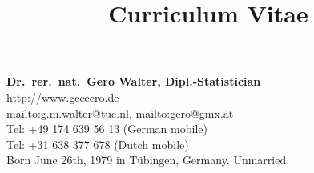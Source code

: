 \documentclass[a4paper]{simplecv}
\begin{document}
\pagestyle{myheadings}




\title{Curriculum Vitae}

\nocite{2016:walter-flapper}
\nocite{2017:walter-aslett-coolen}
\nocite{2016:walter-coolen}
\nocite{ipmu2016}
\nocite{2016:coolenetal}
\nocite{2015:walter-graham-coolen}
\nocite{itip-statinf,Troffaes2014a,diss,Walter2012b,Troffaes2012a,Walter2011a,Walter2010a,%
Walter2009b,Walter2009a,Walter2007c,Walter2007b,Walter2007a,Walter2006a}

\vspace*{-10ex}
\maketitle

\textbf{\large Dr.\ rer.\ nat.\ Gero Walter, Dipl.-Statistician}\\[2ex]
\url{http://www.geeeero.de}\\
\url{mailto:g.m.walter@tue.nl},
\url{mailto:gero@gmx.at}\\
Tel: +49 174 639 56 13 (German mobile)\\
Tel: +31 638 377 678 (Dutch mobile)\\

Born June 26th, 1979 in T\"{u}bingen, Germany. Unmarried.

\end{document}

